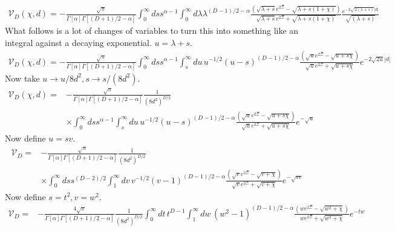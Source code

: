 \begin{align}
\mathcal{V}_D(\chi,d)=-\frac{\sqrt{\pi}}{\Gamma[\alpha]\Gamma\left[(D+1)/2-\alpha\right]}
\int_0^\infty ds s^{\alpha-1}\int_0^\infty d\lambda \lambda^{(D-1)/2-\alpha}
\frac{\left(\sqrt{\lambda+s}e^{2\Xi }- \sqrt{\lambda +s(1 +\chi)}\right) }
{\sqrt{\lambda +s} e^{2 \Xi }+\sqrt{\lambda +s(1+\chi)}}\frac{e^{-2\sqrt{2(\lambda+s) } |d|}}{\sqrt{(\lambda+s)}}
\end{align}
What follows is a lot of changes of variables to turn this into something like an integral against a decaying exponential.  
$u=\lambda+s$.  
\begin{align}
\mathcal{V}_D(\chi,d)=-\frac{\sqrt{\pi}}{\Gamma[\alpha]\Gamma\left[(D+1)/2-\alpha\right]}
\int_0^\infty ds s^{\alpha-1}\int_s^\infty du\, u^{-1/2}(u-s)^{(D-1)/2-\alpha}
\frac{\left(\sqrt{u}e^{2\Xi }- \sqrt{u + s\chi}\right) }{\sqrt{u} e^{2 \Xi }+\sqrt{u + s\chi}}e^{-2\sqrt{2u } |d|}
\end{align}
Now take $u\rightarrow u/8d^2, s\rightarrow s/(8d^2)$.  
\begin{align}
\mathcal{V}_D(\chi,d)%
=&-\frac{\sqrt{\pi}}{\Gamma[\alpha]\Gamma\left[(D+1)/2-\alpha\right]}\frac{1}{(8d^2)^{D/2}}\nonumber\\
& \times\int_0^\infty ds s^{\alpha-1}\int_s^\infty du\, u^{-1/2} (u-s)^{(D-1)/2-\alpha}
\frac{\left(\sqrt{u}e^{2\Xi }- \sqrt{u + s\chi}\right) }{\sqrt{u} e^{2 \Xi }+\sqrt{u + s\chi}}e^{-\sqrt{u }}
\end{align}
Now define $u = sv$.  
\begin{align}
\mathcal{V}_D=&-\frac{\sqrt{\pi}}{\Gamma[\alpha]\Gamma\left[(D+1)/2-\alpha\right]}\frac{1}{(8d^2)^{D/2}}\nonumber\\
& \times\int_0^\infty ds s^{(D-2)/2}\int_1^\infty dv \, v^{-1/2}(v-1)^{(D-1)/2-\alpha}\frac{\left(\sqrt{v}e^{2\Xi }- \sqrt{v + \chi}\right) }{\sqrt{v} e^{2 \Xi }+\sqrt{v + \chi}}e^{-\sqrt{s v}}
\end{align}
Now define $ s = t^2, v = w^2$.  
\begin{align}
\mathcal{V}_D%
=&-\frac{4\sqrt{\pi}}{\Gamma[\alpha]\Gamma\left[(D+1)/2-\alpha\right]}\frac{1}{(8d^2)^{D/2}}
\int_0^\infty dt\, t^{D-1}\int_1^\infty dw\,(w^2-1)^{(D-1)/2-\alpha}
\frac{\left(w e^{2\Xi }- \sqrt{w^2 + \chi}\right) }{w e^{2 \Xi }+\sqrt{w^2 + \chi}}e^{-tw}
\end{align}
